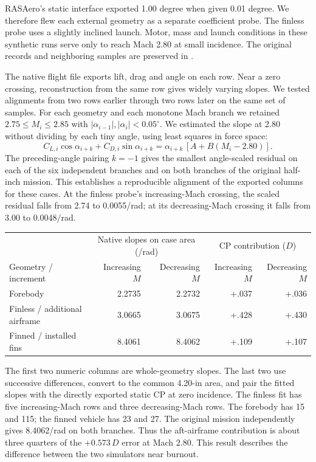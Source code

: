 
 RASAero's static interface exported 1.00 degree when given 0.01 degree. We therefore flew each external geometry as a separate coefficient probe. The finless probe uses a slightly inclined launch. Motor, mass and launch conditions in these synthetic runs serve only to reach Mach 2.80 at small incidence. The original records and neighboring samples are preserved in .

The native flight file exports lift, drag and angle on each row. Near a zero crossing, reconstruction from the same row gives widely varying slopes. We tested alignments from two rows earlier through two rows later on the same set of samples. For each geometry and each monotone Mach branch we retained $2.75\le M_i\le2.85$ with $|\alpha_{i-1}|,|\alpha_i|<0.05^\circ$. We estimated the slope at 2.80 without dividing by each tiny angle, using least squares in force space:
\[
 C_{L,i}\cos\alpha_{i+k}+C_{D,i}\sin\alpha_{i+k}
 =\alpha_{i+k}\,[A+B(M_i-2.80)] .
\]
The preceding-angle pairing $k=-1$ gives the smallest angle-scaled residual on each of the six independent branches and on both branches of the original half-inch mission. This establishes a reproducible alignment of the exported columns for these cases. At the finless probe's increasing-Mach crossing, the scaled residual falls from 2.74 to 0.0055/rad; at its decreasing-Mach crossing it falls from 3.00 to 0.0048/rad.

\begin{center}\small\begin{tabular}{lrrrr}\toprule
&\multicolumn{2}{c}{Native slopes on case area (/rad)}&\multicolumn{2}{c}{CP contribution ($D$)}\\
Geometry / increment & Increasing $M$ & Decreasing $M$ & Increasing $M$ & Decreasing $M$\\\midrule
Forebody &2.2735&2.2732&+.037&+.036\\
Finless / additional airframe &3.0665&3.0675&+.428&+.430\\
Finned / installed fins &8.4061&8.4062&+.109&+.107\\\bottomrule\end{tabular}\end{center}
The first two numeric columns are whole-geometry slopes. The last two use successive differences, convert to the common 4.20-in area, and pair the fitted slopes with the directly exported static CP at zero incidence. The finless fit has five increasing-Mach rows and three decreasing-Mach rows. The forebody has 15 and 115; the finned vehicle has 23 and 27. The original mission independently gives 8.4062/rad on both branches. Thus the aft-airframe contribution is about three quarters of the $+0.573\,D$ error at Mach 2.80. This result describes the difference between the two simulators near burnout.
